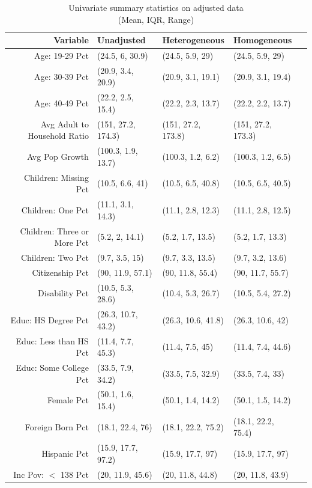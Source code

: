 \begin{table}[h!]
\centering
\caption{Univariate summary statistics on adjusted data \\ (Mean, IQR, Range)}\label{tab:summarytab1}
\begin{tabular}{rllll}
  \hline
Variable & Unadjusted & Heterogeneous & Homogeneous \\ 
  \hline
  Age: 19-29 Pct & (24.5, 6, 30.9) & (24.5, 5.9, 29) & (24.5, 5.9, 29) \\ 
  Age: 30-39 Pct & (20.9, 3.4, 20.9) & (20.9, 3.1, 19.1) & (20.9, 3.1, 19.4) \\ 
  Age: 40-49 Pct & (22.2, 2.5, 15.4) & (22.2, 2.3, 13.7) & (22.2, 2.2, 13.7) \\ 
  Avg Adult to Household Ratio & (151, 27.2, 174.3) & (151, 27.2, 173.8) & (151, 27.2, 173.3) \\ 
  Avg Pop Growth & (100.3, 1.9, 13.7) & (100.3, 1.2, 6.2) & (100.3, 1.2, 6.5) \\ 
  Children: Missing Pct & (10.5, 6.6, 41) & (10.5, 6.5, 40.8) & (10.5, 6.5, 40.5) \\ 
  Children: One Pct & (11.1, 3.1, 14.3) & (11.1, 2.8, 12.3) & (11.1, 2.8, 12.5) \\ 
  Children: Three or More Pct & (5.2, 2, 14.1) & (5.2, 1.7, 13.5) & (5.2, 1.7, 13.3) \\ 
  Children: Two Pct & (9.7, 3.5, 15) & (9.7, 3.3, 13.5) & (9.7, 3.2, 13.6) \\ 
  Citizenship Pct & (90, 11.9, 57.1) & (90, 11.8, 55.4) & (90, 11.7, 55.7) \\ 
  Disability Pct & (10.5, 5.3, 28.6) & (10.4, 5.3, 26.7) & (10.5, 5.4, 27.2) \\ 
  Educ: HS Degree Pct & (26.3, 10.7, 43.2) & (26.3, 10.6, 41.8) & (26.3, 10.6, 42) \\ 
  Educ: Less than HS Pct & (11.4, 7.7, 45.3) & (11.4, 7.5, 45) & (11.4, 7.4, 44.6) \\ 
  Educ: Some College Pct & (33.5, 7.9, 34.2) & (33.5, 7.5, 32.9) & (33.5, 7.4, 33) \\ 
  Female Pct & (50.1, 1.6, 15.4) & (50.1, 1.4, 14.2) & (50.1, 1.5, 14.2) \\ 
  Foreign Born Pct & (18.1, 22.4, 76) & (18.1, 22.2, 75.2) & (18.1, 22.2, 75.4) \\ 
  Hispanic Pct & (15.9, 17.7, 97.2) & (15.9, 17.7, 97) & (15.9, 17.7, 97) \\ 
  Inc Pov: $<$ 138 Pct & (20, 11.9, 45.6) & (20, 11.8, 44.8) & (20, 11.8, 43.9) \\ 

\end{tabular}
\end{table}
